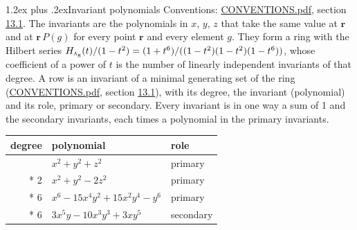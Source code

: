 \documentclass[10pt,a4paper]{article}
\makeatletter
\renewcommand\section{\@startsection{section}{1}{\z@}{-3ex plus -1ex minus -.2ex}%
  {1.2ex plus .2ex}{\normalfont\large\sffamily\bfseries\color{parttitle}}}
\numberwithin{equation}{section}
\newcommand{\irr}[1]{\text{\normalfont\scshape #1}}
\newcommand{\ptag}[1]{\mathrm{#1}}
\newcommand{\pointr}{\mathbf{r}}
\makeatother
\begin{document}
\section{Invariant polynomials}\label{s:invariant_polynomials}
Conventions: \href{../../CONVENTIONS.pdf}{CONVENTIONS.pdf}, section \href{../../CONVENTIONS.pdf\#conv.13.1}{13.1}.
The invariants are the polynomials in $x$, $y$, $z$ that take the same value at $\pointr$ and at $\pointr\,P(g)$ for every point $\pointr$ and every element $g$. They form a ring with the Hilbert series $H_{\irr{a}_{\ptag{g}}}(t)/(1-t^{2}) = (1 + t^{6})/((1-t^{2})(1-t^{2})(1-t^{6}))$, whose coefficient of a power of $t$ is the number of linearly independent invariants of that degree. \label{n:head.degree}\label{n:head.role}A row is an invariant of a minimal generating set of the ring (\href{../../CONVENTIONS.pdf}{CONVENTIONS.pdf}, section \href{../../CONVENTIONS.pdf\#conv.13.1}{13.1}), with its degree, the invariant (polynomial) and its role, primary or secondary. Every invariant is in one way a sum of 1 and the secondary invariants, each times a polynomial in the primary invariants.
{\small\begin{longtable}{@{}rll@{}}\toprule
degree & polynomial & role\\\midrule\endhead
\bottomrule\endfoot\endlastfoot
2 & $x^{2} + y^{2} + z^{2}$ & primary\\*
2 & $x^{2} + y^{2} - 2z^{2}$ & primary\\*
6 & $x^{6} - 15x^{4}y^{2} + 15x^{2}y^{4} - y^{6}$ & primary\\*
6 & $3x^{5}y - 10x^{3}y^{3} + 3xy^{5}$ & secondary\\
\bottomrule\end{longtable}}
\end{document}
